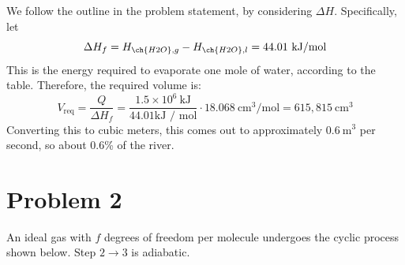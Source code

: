 \documentclass[10pt]{article}
\begin{document}
\begin{enumerate}[label=\alph*)]
			\begin{solution}
				We follow the outline in the problem statement, by considering $\Delta H$. Specifically, 
				let 
				\[
					\Delta H_f = H_{\ch{H2O}, g} - H_{\ch{H2O}, l} = 44.01 \ \mathrm{kJ / mol}
				\] 
				This is the energy required to evaporate one mole of water, according to the table. Therefore, 
				the required volume is:
				\[
					V_{\text{req}} = \frac{Q}{\Delta H_f} = \frac{1.5 \times 10^6 \ \text{kJ}}{44.01 \text{kJ / mol}} \cdot 18.068 \ \mathrm{cm^3/mol} = 615,815 \ \mathrm{cm^3}
				\] 
				Converting this to cubic meters, this comes out to approximately $0.6 \ \mathrm{m^3}$ per 
				second, so about 0.6\% of the river. 
			\end{solution}
	\end{enumerate}
\pagebreak	
	\section*{Problem 2}
	An ideal gas with $f$ degrees of freedom per molecule undergoes the cyclic process shown below. Step 
	$2 \to 3$ is adiabatic.
\end{document}
